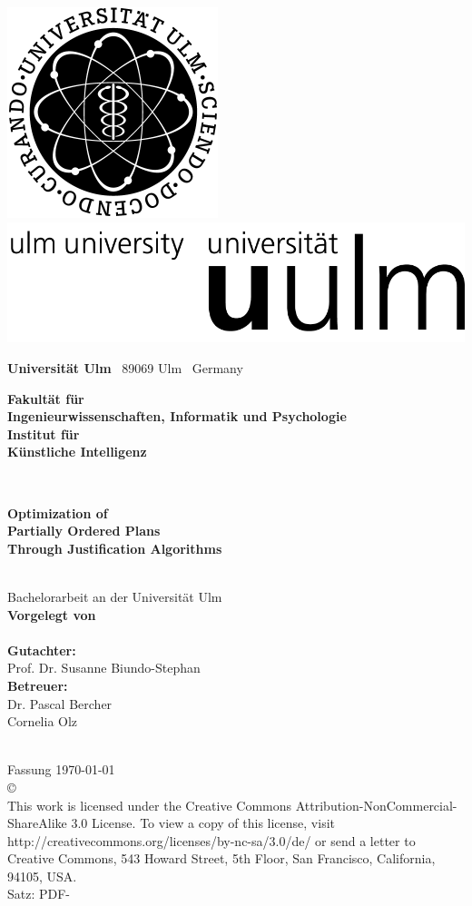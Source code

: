 
\thispagestyle{empty}

\includegraphics[height=1.8 cm]{Abbildungen/unilogo_bild.pdf}
\hfill
\includegraphics[height=1.8 cm]{Abbildungen/unilogo_wort.pdf}\\[2 em]

{\footnotesize
{\bfseries Universit\"at Ulm} \textbar ~89069 Ulm \textbar ~Germany
\hfill\parbox[t]{44.5 mm}{\bfseries Fakult\"at für\\
Ingenieurwissenschaften, Informatik und \mbox{Psychologie}\\[.5em]
\mdseries Institut f\"ur\\ K\"unstliche Intelligenz}\\[6 em]

\parbox{140mm}{\sffamily \bfseries \Huge Optimization of \\Partially Ordered Plans\\ Through Justification Algorithms}\\[.5 em]
{\footnotesize Bachelorarbeit an der Universit\"at Ulm}\\[3 em]

{\footnotesize \bfseries Vorgelegt von}\\
{\footnotesize \authorinfo}\\[2em]
{\footnotesize \bfseries Gutachter:}\\                     
{\footnotesize Prof. Dr. Susanne Biundo-Stephan}\\[2 em]
{\footnotesize \bfseries Betreuer:}\\ 
{\footnotesize Dr. Pascal Bercher\\Cornelia Olz}\\\\
{\footnotesize \the\year}
}

\restoregeometry

\clearpage
\thispagestyle{empty}
{ \small
  \flushleft
  Fassung \today \\\vfill
  \copyright~\the\year~\authorinfo\\[0.5em]
This work is licensed under the Creative Commons Attribution-NonCommercial-ShareAlike 3.0 License. To view a copy of this license, visit http://creativecommons.org/licenses/by-nc-sa/3.0/de/ or send a letter to Creative Commons, 543 Howard Street, 5th Floor, San Francisco, California, 94105, USA. \\
  Satz: PDF-\LaTeXe
}